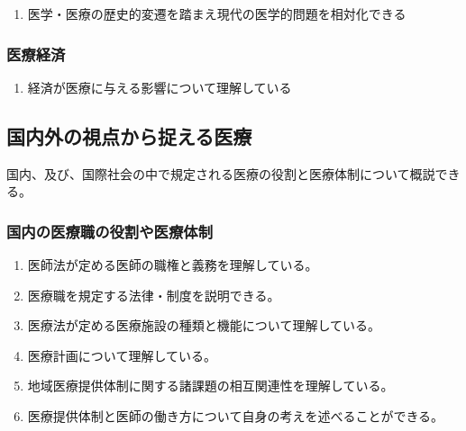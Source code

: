 \begin{enumerate}
\def\labelenumi{\arabic{enumi}.}
\tightlist
\item
  医学・医療の歴史的変遷を踏まえ現代の医学的問題を相対化できる
\end{enumerate}

\hypertarget{ux533bux7642ux7d4cux6e08}{%
\subsubsection{医療経済}\label{ux533bux7642ux7d4cux6e08}}

\begin{enumerate}
\def\labelenumi{\arabic{enumi}.}
\tightlist
\item
  経済が医療に与える影響について理解している
\end{enumerate}

\hypertarget{ux56fdux5185ux5916ux306eux8996ux70b9ux304bux3089ux6349ux3048ux308bux533bux7642}{%
\subsection{国内外の視点から捉える医療}\label{ux56fdux5185ux5916ux306eux8996ux70b9ux304bux3089ux6349ux3048ux308bux533bux7642}}

国内、及び、国際社会の中で規定される医療の役割と医療体制について概説できる。

\hypertarget{ux56fdux5185ux306eux533bux7642ux8077ux306eux5f79ux5272ux3084ux533bux7642ux4f53ux5236}{%
\subsubsection{国内の医療職の役割や医療体制}\label{ux56fdux5185ux306eux533bux7642ux8077ux306eux5f79ux5272ux3084ux533bux7642ux4f53ux5236}}

\begin{enumerate}
\def\labelenumi{\arabic{enumi}.}
\tightlist
\item
  医師法が定める医師の職権と義務を理解している。
\item
  医療職を規定する法律・制度を説明できる。
\item
  医療法が定める医療施設の種類と機能について理解している。
\item
  医療計画について理解している。
\item
  地域医療提供体制に関する諸課題の相互関連性を理解している。
\item
  医療提供体制と医師の働き方について自身の考えを述べることができる。
\end{enumerate}

